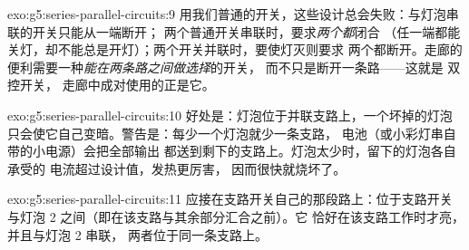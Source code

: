 \begin{solution}{exo:g5:series-parallel-circuits:9}
用我们普通的开关，这些设计总会失败：与灯泡串联的开关只能从一端断开；
两个普通开关串联时，要求\emph{两个都}闭合
（任一端都能关灯，却不能总是开灯）；两个开关并联时，要使灯灭则要求
两个都断开。走廊的便利需要一种\emph{能在两条路之间做选择}的开关，
而不只是断开一条路——这就是
双控开关，
走廊中成对使用的正是它。
\end{solution}

\begin{solution}{exo:g5:series-parallel-circuits:10}
好处是：灯泡位于并联支路上，一个坏掉的灯泡
只会使它自己变暗。警告是：每少一个灯泡就少一条支路，
电池（或小彩灯串自带的小电源）会把全部输出
都送到剩下的支路上。灯泡太少时，留下的灯泡各自承受的
电流超过设计值，发热更厉害，
因而很快就烧坏了。
\end{solution}

\begin{solution}{exo:g5:series-parallel-circuits:11}
应接在支路开关自己的那段路上：位于支路开关
与灯泡 2 之间（即在该支路与其余部分汇合之前）。它
恰好在该支路工作时才亮，并且与灯泡 2 串联，
两者位于同一条支路上。
\end{solution}
